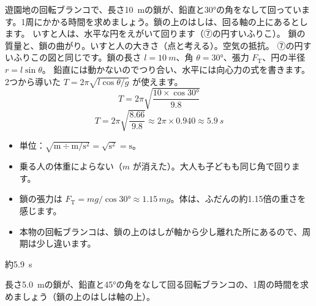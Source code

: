\begin{phreidai}[回転ブランコ]
\label{ph:力-2:ex9}遊園地の回転ブランコで、長さ\qty{10}{m}の鎖が、鉛直と30°の角をなして回っています。1周にかかる時間を求めましょう。鎖の上のはしは、回る軸の上にあるとします。
\phbamen
いすと人は、水平な円をえがいて回ります（⑦の円すいふりこ）。
\phmushi
鎖の質量と、鎖の曲がり。いすと人の大きさ（点と考える）。空気の抵抗。
\phzu
⑦の円すいふりこの図と同じです。鎖の長さ $l=\qty{10}{m}$、角 $\theta=30°$、張力 $F_{\mathrm T}$、円の半径 $r=l\sin\theta$。
\phriyu
鉛直には動かないのでつり合い、水平には向心力の式を書きます。2つから導いた $T=2\pi\sqrt{l\cos\theta/g}$ が使えます。
\phtateru
\[ T=2\pi\sqrt{\frac{10\times\cos30°}{9.8}} \]
\phtoku
\[ T=2\pi\sqrt{\frac{8.66}{9.8}}\approx2\pi\times0.940\approx\qty{5.9}{s} \]
\phtashikame
\begin{itemize}[leftmargin=1.2\zw, itemsep=1pt, topsep=1pt, label={\color{bkTheme}●}]
\item 単位：$\sqrt{\mathrm m\div\mathrm{m/s^2}}=\sqrt{\mathrm s^2}=\mathrm s$。
\item 乗る人の体重によらない（$m$ が消えた）。大人も子どもも同じ角で回ります。
\item 鎖の張力は $F_{\mathrm T}=mg/\cos30°\approx1.15\,mg$。体は、ふだんの約1.15倍の重さを感じます。
\item 本物の回転ブランコは、鎖の上のはしが軸から少し離れた所にあるので、周期は少し違います。
\end{itemize}
\kotae 約\qty{5.9}{s}
\end{phreidai}
\begin{jibun}
長さ\qty{5.0}{m}の鎖が、鉛直と45°の角をなして回る回転ブランコの、1周の時間を求めましょう（鎖の上のはしは軸の上）。
\end{jibun}


